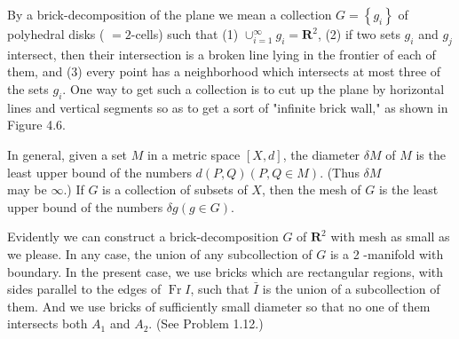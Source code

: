 By a brick-decomposition of the plane we mean a collection $G=\left\{g_{i}\right\}$ of polyhedral disks ( $=2$-cells) such that (1) $\cup_{i=1}^{\infty} g_{i}=\mathbf{R}^{2}$, (2) if two sets $g_{i}$ and $g_{j}$ intersect, then their intersection is a broken line lying in the frontier of each of them, and (3) every point has a neighborhood which intersects at most three of the sets $g_{i}$. One way to get such a collection is to cut up the plane by horizontal lines and vertical segments so as to get a sort of "infinite brick wall," as shown in Figure 4.6.

\begin{center}
\end{center}


In general, given a set $M$ in a metric space $[X, d]$, the diameter $\delta M$ of $M$ is the least upper bound of the numbers $d(P, Q)(P, Q \in M)$. (Thus $\delta M$\\
may be $\infty$.) If $G$ is a collection of subsets of $X$, then the mesh of $G$ is the least upper bound of the numbers $\delta g(g \in G)$.

Evidently we can construct a brick-decomposition $G$ of $\mathbf{R}^{2}$ with mesh as small as we please. In any case, the union of any subcollection of $G$ is a 2 -manifold with boundary. In the present case, we use bricks which are rectangular regions, with sides parallel to the edges of $\operatorname{Fr} I$, such that $\bar{I}$ is the union of a subcollection of them. And we use bricks of sufficiently small diameter so that no one of them intersects both $A_{1}$ and $A_{2}$. (See Problem 1.12.)
